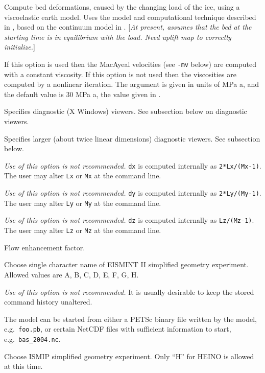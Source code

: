 \documentclass[11pt,final]{amsart}
\begin{document}
 Compute bed deformations, caused by the changing load of the ice, using a viscoelastic earth model.  Uses the model and computational technique described in \cite{BLKfastearth}, based on the continuum model in \cite{LingleClark}.  [\emph{At present, assumes that the bed at the starting time is in equilibrium with the load.  Need uplift map to correctly initialize.}]

  If this option is used then the MacAyeal velocities (see \verb|-mv| below) are computed with a constant viscosity.  If this option is not used then the viscosities are computed by a nonlinear iteration.  The argument is given in units of MPa a, and the default value is $30$ MPa a, the value given in \cite{Ritzetal2001}.

  Specifies diagnostic (X Windows) viewers.  See subsection below on diagnostic viewers.

  Specifies larger (about twice linear dimensions) diagnostic viewers.  See subsection below.

  \emph{Use of this option is not recommended.}  \verb|dx| is computed internally as \verb|2*Lx/(Mx-1)|.  The user may alter \verb|Lx| or \verb|Mx| at the command line.

  \emph{Use of this option is not recommended.}  \verb|dy| is computed internally as \verb|2*Ly/(My-1)|.  The user may alter \verb|Ly| or \verb|My| at the command line.

  \emph{Use of this option is not recommended.}  \verb|dz| is computed internally as \verb|Lz/(Mz-1)|.  The user may alter \verb|Lz| or \verb|Mz| at the command line.

  Flow enhancement factor.

  Choose single character name of EISMINT II \cite{EISMINT00} simplified geometry experiment.  Allowed values are A, B, C, D, E, F, G, H.

  \emph{Use of this option is not recommended.}  It is usually desirable to keep the stored command history unaltered.


  The model can be started from either a PETSc binary file written by the model, e.g.~\verb|foo.pb|, or certain NetCDF files with sufficient information to start, e.g.~\verb|bas_2004.nc|.

  Choose ISMIP simplified geometry experiment.  Only ``H'' for HEINO is allowed at this time.
\end{document}
